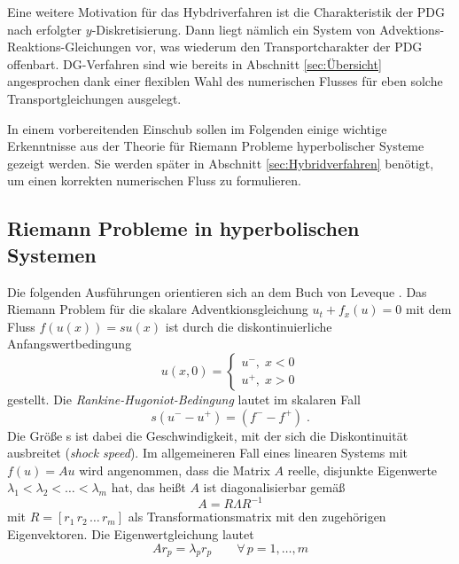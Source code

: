 Eine weitere Motivation für das Hybdriverfahren ist die Charakteristik der PDG nach erfolgter $y$-Diskretisierung. Dann liegt nämlich ein System von Advektions-Reaktions-Gleichungen vor, was wiederum den Transportcharakter der PDG offenbart. DG-Verfahren sind wie bereits in Abschnitt \ref{sec:Übersicht} angesprochen dank einer flexiblen Wahl des numerischen Flusses für eben solche Transportgleichungen ausgelegt.

In einem vorbereitenden Einschub sollen im Folgenden einige wichtige Erkenntnisse aus der Theorie für Riemann Probleme hyperbolischer Systeme gezeigt werden. Sie werden später in Abschnitt \ref{sec:Hybridverfahren} benötigt, um einen korrekten numerischen Fluss zu formulieren.

\subsection{Riemann Probleme in hyperbolischen Systemen}\label{sec:riemann}
Die folgenden Ausführungen orientieren sich an dem Buch von Leveque \cite{buchLeveque}.
Das Riemann Problem für die skalare Adventkionsgleichung $u_t + f_x(u) = 0$ mit dem Fluss $f(u(x)) = s u(x)$ ist durch die diskontinuierliche Anfangswertbedingung
\begin{equation}
  u(x,0) = \begin{cases} u^- , \; x < 0 \\
                         u^+ , \; x > 0
           \end{cases}
\end{equation}
gestellt.  Die \emph{Rankine-Hugoniot-Bedingung} lautet im skalaren Fall
\begin{equation}
  s(u^- - u^+) = (f^- - f^+) \; .
  \label{eq:rhc}
\end{equation}
Die Größe s ist dabei die Geschwindigkeit, mit der sich die Diskontinuität ausbreitet (\emph{shock speed}). Im allgemeineren Fall eines linearen Systems mit $f(u) = A u$ wird angenommen, dass die Matrix $A$ reelle, disjunkte Eigenwerte $\lambda_1 < \lambda_2 < \dots < \lambda_m$ hat, das heißt $A$ ist diagonalisierbar gemäß
\begin{equation}
  A = R \Lambda R^{-1}
\end{equation}
mit $R=[r_1 \, r_2 \, \dots \, r_m]$ als Transformationsmatrix mit den zugehörigen Eigenvektoren. Die Eigenwertgleichung lautet
\begin{equation}
  Ar_p = \lambda_p r_p \qquad \forall \, p=1,\dots, m
  \label{eq:EWeq_A}
\end{equation}
